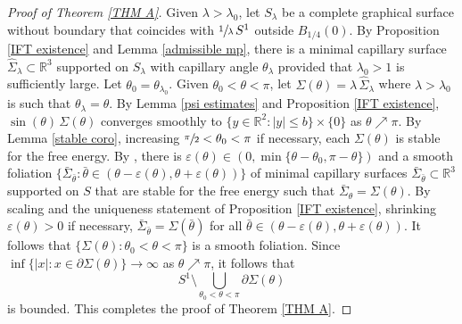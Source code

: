 \documentclass[11pt]{amsart}
\begin{document}
\begin{proof}[Proof of Theorem \ref{THM A}]
   Given $\lambda>\lambda_0$, let $S_\lambda$ be a complete graphical surface without boundary  that coincides with $\sfrac{1}{\lambda}\,S^1$ outside $B_{1/4}(0)$. By Proposition \ref{IFT existence} and Lemma \ref{admissible mp}, there is a minimal capillary surface $ \hat \Sigma_\lambda\subset \mathbb{R}^3$ supported on $S_\lambda$ with capillary angle  $\theta_\lambda$ provided that $\lambda_0>1$ is sufficiently large. Let $\theta_0=\theta_{\lambda_0}$. Given $\theta_0<\theta<\pi$, let 
	$
	\Sigma(\theta)=\lambda\,\hat \Sigma_\lambda
	$ 
	where $\lambda>\lambda_0$ is such that $\theta_\lambda=\theta$. 
	By Lemma \ref{psi estimates} and Proposition \ref{IFT existence}, $\sin(\theta)\,\Sigma(\theta)$ converges smoothly to $\{y\in \mathbb{R}^2:|y|\leq b\}\times \{0\}$ as $\theta \nearrow \pi$. By 
	 Lemma \ref{stable coro}, increasing $\sfrac{\pi}2<\theta_0<\pi$ if necessary, each  $\Sigma(\theta)$ is stable for the free energy. By \cite[Lemma 51]{eichmair2024penrose}, there is $\varepsilon(\theta)\in (0,\min\{\theta-\theta_0,\pi-\theta\})$ and a smooth foliation $\{\bar  \Sigma_{\bar \theta}  : \bar \theta\in(\theta-\varepsilon(\theta),\theta+\varepsilon(\theta))\}$ of  minimal capillary surfaces $\bar  \Sigma_{\bar  \theta}\subset \mathbb{R}^3$ supported on $S$ that are stable for the free energy such that $\bar  \Sigma_{\theta}=\Sigma(\theta)$. By scaling and the uniqueness statement of  Proposition \ref{IFT existence}, shrinking $\varepsilon(\theta)>0$ if necessary, $\bar  \Sigma_{\bar  \theta}= \Sigma(\bar  \theta)$ for all $\bar  \theta \in(\theta-\varepsilon(\theta),\theta+\varepsilon(\theta))$. It follows that $\{\Sigma(\theta):\theta_0<\theta<\pi\}$ is a smooth foliation. Since $\inf\{|x|:x\in\partial \Sigma(\theta)\}\to \infty$ as $\theta\nearrow \pi$, it follows that 
	 $$
	S^1\setminus \bigcup_{\theta_0<\theta<\pi}\partial \Sigma(\theta)
	 $$
	 is bounded. This completes the proof of Theorem \ref{THM A}.
\end{proof}
\end{document}
